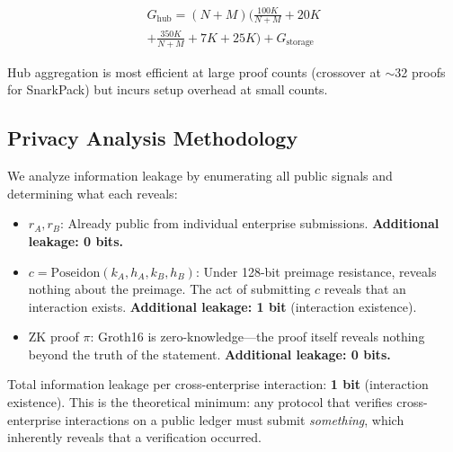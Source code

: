 \begin{multline}
G_\text{hub} = (N + M) \biggl(\frac{100K}{N+M} + 20K \\
  + \frac{350K}{N+M} + 7K + 25K\biggr) + G_\text{storage}
\end{multline}

Hub aggregation is most efficient at large proof counts (crossover at $\sim$32
proofs for SnarkPack) but incurs setup overhead at small counts.

\subsection{Privacy Analysis Methodology}

We analyze information leakage by enumerating all public signals and
determining what each reveals:

\begin{itemize}
\item $r_A, r_B$: Already public from individual enterprise submissions.
  \textbf{Additional leakage: 0 bits.}
\item $c = \text{Poseidon}(k_A, h_A, k_B, h_B)$: Under 128-bit preimage
  resistance, reveals nothing about the preimage. The act of submitting $c$
  reveals that an interaction exists. \textbf{Additional leakage: 1 bit}
  (interaction existence).
\item ZK proof $\pi$: Groth16 is zero-knowledge---the proof itself reveals
  nothing beyond the truth of the statement. \textbf{Additional leakage: 0 bits.}
\end{itemize}

Total information leakage per cross-enterprise interaction: \textbf{1 bit}
(interaction existence). This is the theoretical minimum: any protocol that
verifies cross-enterprise interactions on a public ledger must submit
\emph{something}, which inherently reveals that a verification occurred.
